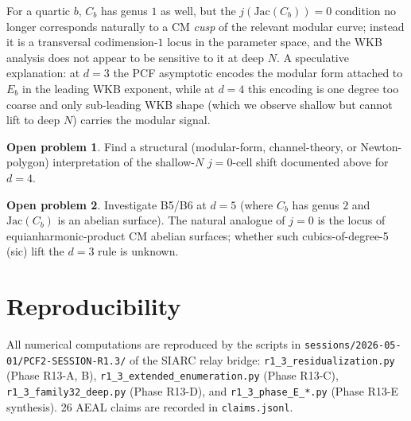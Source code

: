 \documentclass[11pt]{amsart}
\theoremstyle{plain}
\theoremstyle{definition}
\newtheorem{problem}{Open problem}
\begin{document}
For a quartic $b$, $C_b$ has genus $1$ as well, but the
$j(\mathrm{Jac}(C_b))=0$ condition no longer corresponds
naturally to a CM \emph{cusp} of the relevant modular curve;
instead it is a transversal codimension-$1$ locus in the
parameter space, and the WKB analysis does not appear to be
sensitive to it at deep $N$.  A speculative explanation: at
$d=3$ the PCF asymptotic encodes the modular form attached to
$E_b$ in the leading WKB exponent, while at $d=4$ this
encoding is one degree too coarse and only sub-leading WKB
shape (which we observe shallow but cannot lift to deep $N$)
carries the modular signal.

\begin{problem}\label{op:shallow-j-effect-d4}
Find a structural (modular-form, channel-theory, or
Newton-polygon) interpretation of the shallow-$N$ $j=0$-cell
shift documented above for $d=4$.
\end{problem}

\begin{problem}\label{op:b5-genus-2}
Investigate B5/B6 at $d=5$ (where $C_b$ has genus $2$ and
$\mathrm{Jac}(C_b)$ is an abelian surface).  The natural
analogue of $j=0$ is the locus of equianharmonic-product CM
abelian surfaces; whether such cubics-of-degree-5 (sic) lift
the $d=3$ rule is unknown.
\end{problem}

\section*{Reproducibility}

All numerical computations are reproduced by the scripts in
\verb|sessions/2026-05-01/PCF2-SESSION-R1.3/| of the SIARC
relay bridge:
\verb|r1_3_residualization.py| (Phase R13-A, B),
\verb|r1_3_extended_enumeration.py| (Phase R13-C),
\verb|r1_3_family32_deep.py| (Phase R13-D), and
\verb|r1_3_phase_E_*.py| (Phase R13-E synthesis).
26 AEAL claims are recorded in
\verb|claims.jsonl|.
\end{document}
